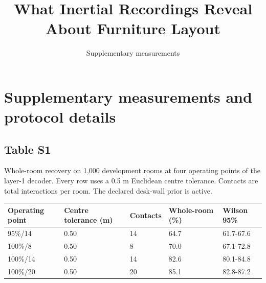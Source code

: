 \documentclass[10pt,letterpaper]{article}
\title{What Inertial Recordings Reveal About Furniture Layout}
\author{Supplementary measurements}
\begin{document}
\maketitle
\section*{Supplementary measurements and protocol details}


\begin{minipage}{\linewidth}\subsection*{Table S1}
Whole-room recovery on 1,000 development rooms at four operating points
of the layer-1 decoder. Every row uses a 0.5 m Euclidean centre
tolerance. Contacts are total interactions per room. The declared
desk-wall prior is active.



\begin{center}\small\begin{tabular}{@{}p{}p{}p{}p{}p{}@{}}\toprule
\textbf{Operating point} & \textbf{Centre tolerance (m)} & \textbf{Contacts} & \textbf{Whole-room (\%)} & \textbf{Wilson 95\%} \\ \midrule
95\%/14 & 0.50 & 14 & 64.7 & 61.7-67.6 \\
100\%/8 & 0.50 & 8 & 70.0 & 67.1-72.8 \\
100\%/14 & 0.50 & 14 & 82.6 & 80.1-84.8 \\
100\%/20 & 0.50 & 20 & 85.1 & 82.8-87.2 \\
\bottomrule\end{tabular}\end{center}
\end{minipage}\par\medskip
\end{document}
